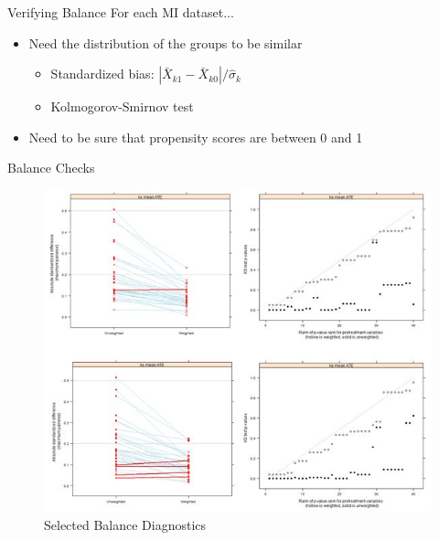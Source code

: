 \begin{frame}{Verifying Balance}
For each MI dataset...
\begin{itemize}
\item Need the distribution of the groups to be similar
\begin{itemize}
\item Standardized bias: $|\bar{X}_{k1}-\bar{X}_{k0}|/ \hat{\sigma}_k$
\item Kolmogorov-Smirnov test 
\end{itemize}
\item Need to be sure that propensity scores are between 0 and 1
\end{itemize}
\end{frame}



\begin{frame}{Balance Checks}
  \begin{figure}[h!]
  \centering
\includegraphics[width=.8\textwidth]{balance_diagnosis} 
  \caption{Selected Balance Diagnostics}
\label{fig:balcheck}
\end{figure}

\end{frame}

